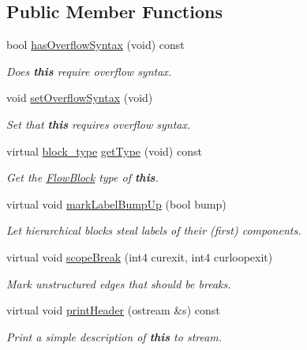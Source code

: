 \subsection*{Public Member Functions}
\begin{DoxyCompactItemize}
\item 
bool \mbox{\hyperlink{class_block_while_do_a3ab5b1bf634b0301449da7366e78f352}{has\+Overflow\+Syntax}} (void) const
\begin{DoxyCompactList}\small\item\em Does {\bfseries{this}} require overflow syntax. \end{DoxyCompactList}\item 
void \mbox{\hyperlink{class_block_while_do_a29dda35c88940834f2af760dbeb0512d}{set\+Overflow\+Syntax}} (void)
\begin{DoxyCompactList}\small\item\em Set that {\bfseries{this}} requires overflow syntax. \end{DoxyCompactList}\item 
virtual \mbox{\hyperlink{class_flow_block_a70df78390870fcdd51e31426ba6a193e}{block\+\_\+type}} \mbox{\hyperlink{class_block_while_do_a7bb1454de32707fac664051525c58d47}{get\+Type}} (void) const
\begin{DoxyCompactList}\small\item\em Get the \mbox{\hyperlink{class_flow_block}{Flow\+Block}} type of {\bfseries{this}}. \end{DoxyCompactList}\item 
virtual void \mbox{\hyperlink{class_block_while_do_ac850d56fa3365a195b91373ef00d7bd3}{mark\+Label\+Bump\+Up}} (bool bump)
\begin{DoxyCompactList}\small\item\em Let hierarchical blocks steal labels of their (first) components. \end{DoxyCompactList}\item 
virtual void \mbox{\hyperlink{class_block_while_do_a87ab7a000da06ffdca299db53495eae0}{scope\+Break}} (int4 curexit, int4 curloopexit)
\begin{DoxyCompactList}\small\item\em Mark unstructured edges that should be {\itshape breaks}. \end{DoxyCompactList}\item 
virtual void \mbox{\hyperlink{class_block_while_do_a298687d8d9dbe264f779cca2c89ca32e}{print\+Header}} (ostream \&s) const
\begin{DoxyCompactList}\small\item\em Print a simple description of {\bfseries{this}} to stream. \end{DoxyCompactList}\item 

\end{DoxyCompactItemize}
